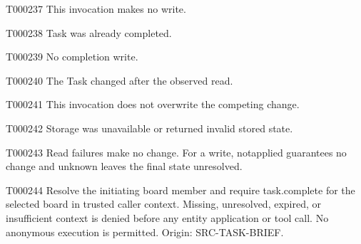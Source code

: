 \documentclass[11pt,a4paper]{article}
\begin{document}
\begin{atlasparagraph}{T000237}
This invocation makes no write.
\end{atlasparagraph}
\begin{atlasparagraph}{T000238}
Task was already completed.
\end{atlasparagraph}
\begin{atlasparagraph}{T000239}
No completion write.
\end{atlasparagraph}
\begin{atlasparagraph}{T000240}
The Task changed after the observed read.
\end{atlasparagraph}
\begin{atlasparagraph}{T000241}
This invocation does not overwrite the competing change.
\end{atlasparagraph}
\begin{atlasparagraph}{T000242}
Storage was unavailable or returned invalid stored state.
\end{atlasparagraph}
\begin{atlasparagraph}{T000243}
Read failures make no change. For a write, not\AtlasCharUnderscore{}applied guarantees no change and unknown leaves the final state unresolved.
\end{atlasparagraph}
\begin{atlasparagraph}{T000244}
Resolve the initiating board member and require task.complete for the selected board in trusted caller context. Missing, unresolved, expired, or insufficient context is denied before any entity application or tool call. No anonymous execution is permitted. Origin: SRC-TASK-BRIEF.
\end{atlasparagraph}
\end{document}
